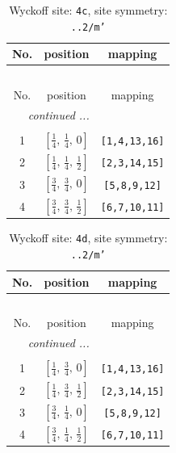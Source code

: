 \documentclass[fleqn,8pt]{jsarticle}
\begin{document}
\renewcommand{\arraystretch}{1.2}
\begin{longtable}{ccc}
\caption{Wyckoff site: {\tt 4c}, site symmetry: {\tt ..2/m'}}
 \\
 \hline \hline
No. & position & mapping \\ \hline \endfirsthead

\multicolumn{2}{l}{\tablename\ \thetable{}} \\
 \hline \hline
No. & position & mapping \\ \hline \endhead

 \hline \hline
\multicolumn{2}{r}{\footnotesize\it continued ...} \\ \endfoot

 \hline \hline
\multicolumn{2}{r}{} \\ \endlastfoot

1 & $\left[ \frac{1}{4},\, \frac{1}{4},\, 0 \right]$ & {\tt [1,4,13,16]} \\ \hline
2 & $\left[ \frac{1}{4},\, \frac{1}{4},\, \frac{1}{2} \right]$ & {\tt [2,3,14,15]} \\ \hline
3 & $\left[ \frac{3}{4},\, \frac{3}{4},\, 0 \right]$ & {\tt [5,8,9,12]} \\ \hline
4 & $\left[ \frac{3}{4},\, \frac{3}{4},\, \frac{1}{2} \right]$ & {\tt [6,7,10,11]} \\
\end{longtable}
\renewcommand{\arraystretch}{1.2}
\begin{longtable}{ccc}
\caption{Wyckoff site: {\tt 4d}, site symmetry: {\tt ..2/m'}}
 \\
 \hline \hline
No. & position & mapping \\ \hline \endfirsthead

\multicolumn{2}{l}{\tablename\ \thetable{}} \\
 \hline \hline
No. & position & mapping \\ \hline \endhead

 \hline \hline
\multicolumn{2}{r}{\footnotesize\it continued ...} \\ \endfoot

 \hline \hline
\multicolumn{2}{r}{} \\ \endlastfoot

1 & $\left[ \frac{1}{4},\, \frac{3}{4},\, 0 \right]$ & {\tt [1,4,13,16]} \\ \hline
2 & $\left[ \frac{1}{4},\, \frac{3}{4},\, \frac{1}{2} \right]$ & {\tt [2,3,14,15]} \\ \hline
3 & $\left[ \frac{3}{4},\, \frac{1}{4},\, 0 \right]$ & {\tt [5,8,9,12]} \\ \hline
4 & $\left[ \frac{3}{4},\, \frac{1}{4},\, \frac{1}{2} \right]$ & {\tt [6,7,10,11]} \\
\end{longtable}
\end{document}
